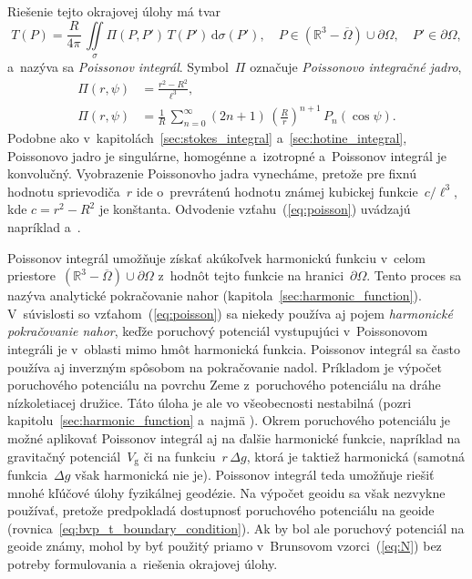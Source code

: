 \documentclass[a4paper, 12pt]{book}
\newcommand{\diff}{\mathrm d}
\newcommand{\gidx}{\mathrm g}
\begin{document}
Riešenie tejto okrajovej úlohy má tvar
%
\begin{equation}
\label{eq:poisson}
T(P) = \frac{R}{4\pi} \, \iint\limits_\sigma \Pi(P, P') \, T(P') \, 
\diff\sigma(P'){,} \quad P \in \left( \mathbb{R}^3 - \overline\Omega \right) 
\cup \partial\Omega{,} \quad P' \in \partial\Omega{,}
\end{equation}
%
a~nazýva sa \emph{Poissonov integrál}.  Symbol~$\Pi$ označuje \emph{Poissonovo 
integračné jadro},
%
\begin{align}
\Pi(r, \psi) &= \frac{r^2 - R^2}{\ell^3}{,}\label{eq:poisson_kernel}\\
\Pi(r, \psi) &= \frac{1}{R} \, \sum_{n = 0}^{\infty} (2n + 1) \, \left( 
\frac{R}{r} \right)^{n + 1} \, 
P_n(\cos\psi)\label{eq:poisson_kernel_spectral}{.}
\end{align}
%
Podobne ako v~kapitolách~\ref{sec:stokes_integral} a~\ref{sec:hotine_integral}, 
Poissonovo jadro je singulárne, homogénne a~izotropné a~Poissonov integrál je 
konvolučný.  Vyobrazenie Poissonovho jadra vynecháme, pretože pre fixnú hodnotu 
sprievodiča~$r$ ide o~prevrátenú hodnotu známej kubickej funkcie~$c \slash 
\ell^3$, kde $c = r^2 - R^2$ je konštanta.  Odvodenie vzťahu~(\ref{eq:poisson}) 
uvádzajú napríklad \textcite{MoritzPhysicalGeodesy} 
a~\textcite{SansoGeoidDetermination}.

Poissonov integrál umožňuje získať akúkoľvek harmonickú funkciu v~celom 
priestore~$\left( \mathbb{R}^3 - \overline\Omega \right) \cup \partial\Omega$ 
z~hodnôt tejto funkcie na hranici~$\partial\Omega$.  Tento proces sa nazýva 
analytické pokračovanie nahor (kapitola~\ref{sec:harmonic_function}).  
V~súvislosti so vzťahom~(\ref{eq:poisson}) sa niekedy používa aj pojem 
\emph{harmonické pokračovanie nahor}, keďže poruchový potenciál vystupujúci 
v~Poissonovom integráli je v~oblasti mimo hmôt harmonická funkcia.  Poissonov 
integrál sa často používa aj inverzným spôsobom na pokračovanie nadol.  
Príkladom je výpočet poruchového potenciálu na povrchu Zeme z~poruchového 
potenciálu na dráhe nízkoletiacej družice.  Táto úloha je ale vo všeobecnosti 
nestabilná (pozri kapitolu~\ref{sec:harmonic_function} a~najmä 
\cite{SansoGeodeticBoundaryValueProblem}).  Okrem poruchového potenciálu je 
možné aplikovať Poissonov integrál aj na ďalšie harmonické funkcie, napríklad 
na gravitačný potenciál~$V_\gidx$ či na funkciu~$r \, \Delta g$, ktorá je 
taktiež harmonická (samotná funkcia~$\Delta g$ však harmonická nie je).  
Poissonov integrál teda umožňuje riešiť mnohé kľúčové úlohy fyzikálnej 
geodézie.  Na výpočet geoidu sa však nezvykne používať, pretože predpokladá 
dostupnosť poruchového potenciálu na geoide 
(rovnica~\ref{eq:bvp_t_boundary_condition}).  Ak by bol ale poruchový potenciál 
na geoide známy, mohol by byť použitý priamo v~Brunsovom vzorci~(\ref{eq:N}) 
bez potreby formulovania a~riešenia okrajovej úlohy.
\end{document}
